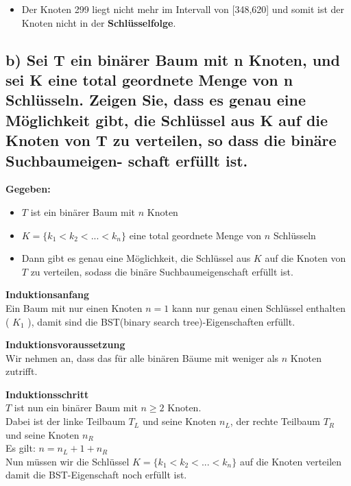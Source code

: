 \begin{enumerate}
\begin{itemize}
	\item Der Knoten 299 liegt nicht mehr im Intervall von [348,620] und somit ist der Knoten nicht in der \textbf{Schlüsselfolge}.
\end{itemize}


\end{enumerate}

\subsection*{b) Sei T ein binärer Baum mit n Knoten, und sei K eine total geordnete Menge
von n Schlüsseln. Zeigen Sie, dass es genau eine Möglichkeit gibt, die Schlüssel
aus K auf die Knoten von T zu verteilen, so dass die binäre Suchbaumeigen-
schaft erfüllt ist.} 

\textbf{Gegeben:}

\begin{itemize}
	\item $T$ ist ein binärer Baum mit $n$ Knoten
	\item $K = \{k_{1} < k_{2} < ... < k_{n}\}$ eine total geordnete Menge von $n$ Schlüsseln
	\item Dann gibt es genau eine Möglichkeit, die Schlüssel aus $K$ auf die Knoten von $T$ zu verteilen, sodass die binäre Suchbaumeigenschaft erfüllt ist.
\end{itemize}

\textbf{Induktionsanfang} \\
Ein Baum mit nur einen Knoten $n=1$ kann nur genau einen Schlüssel enthalten ( $K_{1}$ ), damit sind die BST(binary search tree)-Eigenschaften erfüllt.

\textbf{Induktionsvoraussetzung}\\
Wir nehmen an, dass das für alle binären Bäume mit weniger als $n$ Knoten zutrifft.

\textbf{Induktionsschritt} \\
$T$ ist nun ein binärer Baum mit $n \geq 2$ Knoten. \\
Dabei ist der linke Teilbaum $T_{L}$ und seine Knoten $n_{L}$, der rechte Teilbaum $T_{R}$ und seine Knoten $n_{R}$ \\
Es gilt: $n=n_{L} + 1 + n_{R}$ \\

Nun müssen wir die Schlüssel $K = \{k_{1} < k_{2} < ... < k_{n}\}$ auf die Knoten verteilen damit die BST-Eigenschaft noch erfüllt ist. \\

